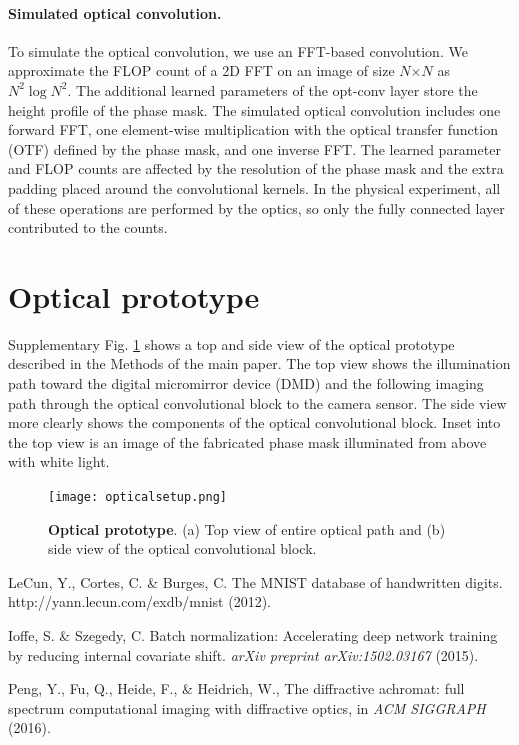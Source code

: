 \documentclass[fleqn,10pt]{wlscirepsupp}
\begin{document}
\paragraph{Simulated optical convolution.} To simulate the optical convolution, we use an FFT-based convolution. We approximate the FLOP count of a 2D FFT on an image of size $N$$\times$$N$ as $N^2 \log N^2$. The additional learned parameters of the opt-conv layer store the height profile of the phase mask. The simulated optical convolution includes one forward FFT, one element-wise multiplication with the optical transfer function (OTF) defined by the phase mask, and one inverse FFT. The learned parameter and FLOP counts are affected by the resolution of the phase mask and the extra padding placed around the convolutional kernels. In the physical experiment, all of these operations are performed by the optics, so only the fully connected layer contributed to the counts.

\newpage 

\section{Optical prototype}

Supplementary Fig. \ref{fig:prototype} shows a top and side view of the optical prototype described in the Methods of the main paper. The top view shows the illumination path toward the digital micromirror device (DMD) and the following imaging path through the optical convolutional block to the camera sensor. The side view more clearly shows the components of the optical convolutional block. Inset into the top view is an image of the fabricated phase mask illuminated from above with white light.

\begin{figure}[h]
\centering
\texttt{[image: opticalsetup.png]}
\caption{\textbf{Optical prototype}. (a) Top view of entire optical path and (b) side view of the optical convolutional block.}
\label{fig:prototype}
\end{figure}





%

\begin{thebibliography}{00}

 LeCun, Y., Cortes, C. \& Burges, C. The MNIST database of handwritten digits. http://yann.lecun.com/exdb/mnist (2012).

 Ioffe, S. \& Szegedy, C. Batch normalization: Accelerating deep network training by reducing internal covariate shift. \textit{arXiv preprint arXiv:1502.03167} (2015).

 Peng, Y., Fu, Q., Heide, F., \& Heidrich, W., The diffractive achromat: full spectrum computational imaging with diffractive optics, in \textit{ACM SIGGRAPH} (2016). 


\end{thebibliography}

\end{document}
